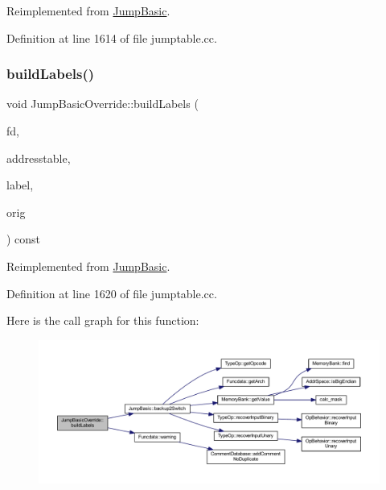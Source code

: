 Reimplemented from \mbox{\hyperlink{class_jump_basic_a42533b11d12a5f819bb88abb21037d94}{Jump\+Basic}}.



Definition at line 1614 of file jumptable.\+cc.

\mbox{\label{class_jump_basic_override_a1fff9a672edb2225dae051d7ed6b57b5}} 
\subsubsection{\texorpdfstring{buildLabels()}{buildLabels()}}
{\footnotesize\ttfamily void Jump\+Basic\+Override\+::build\+Labels (\begin{DoxyParamCaption}\item[{\mbox{\hyperlink{class_funcdata}{Funcdata}} $\ast$}]{fd,  }\item[{vector$<$ \mbox{\hyperlink{class_address}{Address}} $>$ \&}]{addresstable,  }\item[{vector$<$ \mbox{\hyperlink{types_8h_a2db313c5d32a12b01d26ac9b3bca178f}{uintb}} $>$ \&}]{label,  }\item[{const \mbox{\hyperlink{class_jump_model}{Jump\+Model}} $\ast$}]{orig }\end{DoxyParamCaption}) const\hspace{0.3cm}{\ttfamily [virtual]}}



Reimplemented from \mbox{\hyperlink{class_jump_basic_ad3c8a1257f973c18e25935ee932076c4}{Jump\+Basic}}.



Definition at line 1620 of file jumptable.\+cc.

Here is the call graph for this function\+:
\nopagebreak
\begin{figure}[H]
\begin{center}
\leavevmode
\includegraphics[width=350pt]{class_jump_basic_override_a1fff9a672edb2225dae051d7ed6b57b5_cgraph}
\end{center}
\end{figure}
\mbox{\label{class_jump_basic_override_a40c8f33ede7812c04d4f343ea1fc5f53}} 
